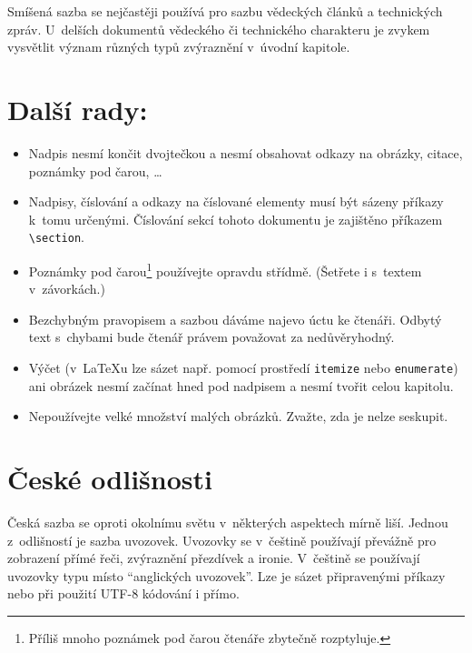 \documentclass[twocolumn, 10pt]{article}[23.2.2024]
\begin{document}
Smíšená sazba se nejčastěji používá pro sazbu vědeckých článků a technických zpráv.
U~delších dokumentů vědeckého či technického charakteru je zvykem vysvětlit význam různých typů zvýraznění v~úvodní kapitole.\par

\section {Další rady:}
\begin{itemize}
	\item Nadpis nesmí končit dvojtečkou a nesmí obsahovat odkazy na obrázky, citace, poznámky pod čarou, \ldots

\item Nadpisy, číslování a odkazy na číslované elementy musí být sázeny příkazy k~tomu určenými. Číslování sekcí tohoto dokumentu je zajištěno příkazem \verb|\section|.

\item Poznámky pod čarou\footnote{Příliš mnoho poznámek pod čarou čtenáře zbytečně rozptyluje.}  používejte opravdu střídmě.
(Šetřete i s~textem v~závorkách.)

\item  Bezchybným pravopisem a sazbou dáváme najevo úctu ke čtenáři. Odbytý text s~chybami bude čtenář právem považovat za nedůvěryhodný.

\item Výčet (v~\LaTeX u lze sázet např. pomocí prostředí \verb|itemize| nebo \verb|enumerate|) ani obrázek nesmí začínat hned pod nadpisem a nesmí tvořit celou kapitolu.

\item Nepoužívejte velké množství malých obrázků.
Zvažte, zda je nelze seskupit.
\end{itemize}

\section {České odlišnosti}
Česká sazba se oproti okolnímu světu v~některých aspektech mírně liší.
Jednou z~odlišností je sazba uvozovek.
Uvozovky se v~češtině používají převážně pro zobrazení přímé řeči, zvýraznění přezdívek a ironie.
V~češtině se používají uvozovky typu  místo ``anglických uvozovek''.
Lze je sázet připravenými příkazy nebo při použití UTF-8 kódování i přímo.\par
\end{document}
